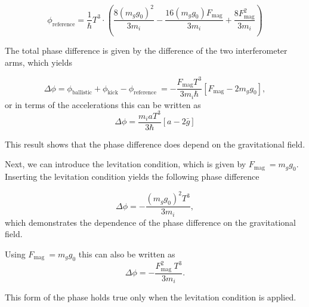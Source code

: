 \documentclass[aps,prx,onecolumn,superscriptaddress,longbibliography]{revtex4-2}
\begin{document}
\begin{appendix}
\begin{equation}
    \phi_{\text {reference}} =  \frac{1}{\hbar}T^{3} \cdot \left(\frac{8 (m_g g_0)^{2}}{3 m_{i}} - \frac{16 (m_g g_0) F_{\text {mag}}}{3 m_{i}} + \frac{8 F_{\text {mag}}^{2}}{3 m_{i}}\right)
\end{equation}

The total phase difference is given by the difference of the two interferometer arms, which yields

\begin{equation}
    \Delta \phi = \phi_{\text {ballistic}}+ \phi_{\text {kick}} - \phi_{\text {reference }} = -\frac{F_{\text {mag}}T^3}{3 m_i\hbar}[F_{\text {mag}}-2 m_g g_0],
\end{equation}
or in terms of the accelerations this can be written as
\begin{equation}\label{phase_result}
    \Delta \phi = \frac{m_i a T^3}{3 \hbar}[a-2 \bar{g}]
\end{equation}

This result shows that the phase difference does depend on the gravitational field. 

Next, we can introduce the levitation condition, which is given by $F_{\text {mag }} = m_g g_0$. Inserting the levitation condition yields the following phase difference

\begin{equation}
    \Delta \phi = - \frac{(m_g g_0)^{2} T^{3}}{3 m_{i}},
\end{equation}
which demonstrates the dependence of the phase difference on the gravitational field. 

Using $F_{\text {mag }} = m_g g_0$ this can also be written as
\begin{equation}
    \Delta \phi = - \frac{F_{\text {mag }}^{2} T^{3}}{3 m_{i}}.
\end{equation}

This form of the phase holds true only when the levitation condition is applied.


\end{appendix}
\end{document}
